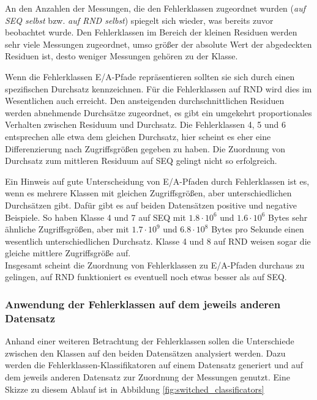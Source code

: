 \documentclass[
	12pt,
	a4paper,
	BCOR10mm,
	DIV14,
	listof=totoc,
	bibliography=totoc,
	headsepline
]{scrreprt}
\begin{document}
An den Anzahlen der Messungen, die den Fehlerklassen zugeordnet wurden (\textit{auf SEQ selbst} bzw. \textit{auf RND selbst}) spiegelt sich wieder, was bereits zuvor beobachtet wurde.
Den Fehlerklassen im Bereich der kleinen Residuen werden sehr viele Messungen zugeordnet, umso größer der absolute Wert der abgedeckten Residuen ist, desto weniger Messungen gehören zu der Klasse.\medskip

Wenn die Fehlerklassen E/A-Pfade repräsentieren sollten sie sich durch einen spezifischen Durchsatz kennzeichnen.
Für die Fehlerklassen auf RND wird dies im Wesentlichen auch erreicht.
Den ansteigenden durchschnittlichen Residuen werden abnehmende Durchsätze zugeordnet, es gibt ein umgekehrt proportionales Verhalten zwischen Residuum und Durchsatz.
Die Fehlerklassen 4, 5 und 6 entsprechen alle etwa dem gleichen Durchsatz, hier scheint es eher eine Differenzierung nach Zugriffsgrößen gegeben zu haben.
Die Zuordnung von Durchsatz zum mittleren Residuum auf SEQ gelingt nicht so erfolgreich.\medskip

Ein Hinweis auf gute Unterscheidung von E/A-Pfaden durch Fehlerklassen ist es, wenn es mehrere Klassen mit gleichen Zugriffsgrößen, aber unterschiedlichen Durchsätzen gibt.
Dafür gibt es auf beiden Datensätzen positive und negative Beispiele.
So haben Klasse 4 und 7 auf SEQ mit $1.8\cdot 10^6$ und $1.6\cdot 10^6$ Bytes sehr ähnliche Zugriffsgrößen, aber mit $1.7\cdot 10^9$ und $6.8\cdot 10^8$ Bytes pro Sekunde einen wesentlich unterschiedlichen Durchsatz.
Klasse 4 und 8 auf RND weisen sogar die gleiche mittlere Zugriffsgröße auf.\\
Insgesamt scheint die Zuordnung von Fehlerklassen zu E/A-Pfaden durchaus zu gelingen, auf RND funktioniert es eventuell noch etwas besser als auf SEQ.

\subsubsection{Anwendung der Fehlerklassen auf dem jeweils anderen Datensatz}
Anhand einer weiteren Betrachtung der Fehlerklassen sollen die Unterschiede zwischen den Klassen auf den beiden Datensätzen analysiert werden.
Dazu werden die Fehlerklassen-Klassifikatoren auf einem Datensatz generiert und auf dem jeweils anderen Datensatz zur Zuordnung der Messungen genutzt.
Eine Skizze zu diesem Ablauf ist in Abbildung \ref{fig:switched_classificators}
\end{document}
